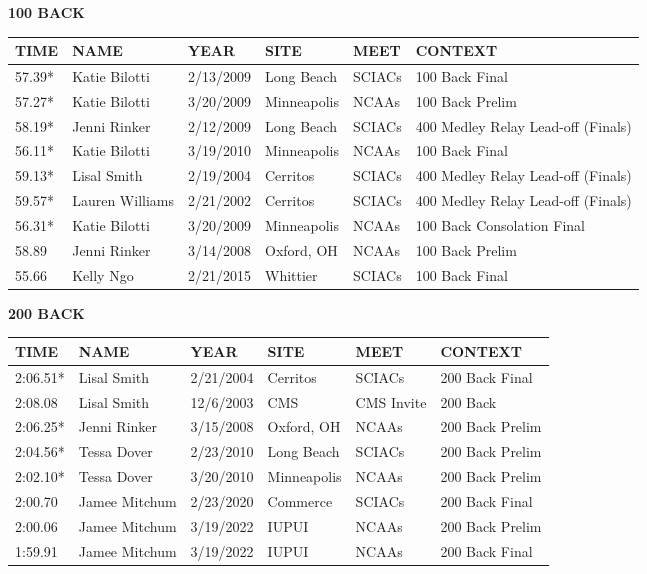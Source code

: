 \begin{minipage}[t]{0.48\textwidth}
\centering
\textbf{100 BACK}\\[0.05cm]
\begin{tabular}{@{}p{1.8cm}p{2.8cm}p{1.2cm}p{1.4cm}p{1.4cm}p{2.0cm}@{}}
\hline
\textbf{TIME} & \textbf{NAME} & \textbf{YEAR} & \textbf{SITE} & \textbf{MEET} & \textbf{CONTEXT} \\
\hline
57.39* & Katie Bilotti & 2/13/2009 & Long Beach & SCIACs & 100 Back Final \\
57.27* & Katie Bilotti & 3/20/2009 & Minneapolis & NCAAs & 100 Back Prelim \\
58.19* & Jenni Rinker & 2/12/2009 & Long Beach & SCIACs & 400 Medley Relay Lead-off (Finals) \\
56.11* & Katie Bilotti & 3/19/2010 & Minneapolis & NCAAs & 100 Back Final \\
59.13* & Lisal Smith & 2/19/2004 & Cerritos & SCIACs & 400 Medley Relay Lead-off (Finals) \\
59.57* & Lauren Williams & 2/21/2002 & Cerritos & SCIACs & 400 Medley Relay Lead-off (Finals) \\
56.31* & Katie Bilotti & 3/20/2009 & Minneapolis & NCAAs & 100 Back Consolation Final \\
58.89 & Jenni Rinker & 3/14/2008 & Oxford, OH & NCAAs & 100 Back Prelim \\
55.66 & Kelly Ngo & 2/21/2015 & Whittier & SCIACs & 100 Back Final \\
\hline
\end{tabular}
\end{minipage}\hfill
\begin{minipage}[t]{0.48\textwidth}
\centering
\textbf{200 BACK}\\[0.05cm]
\begin{tabular}{@{}p{1.8cm}p{2.8cm}p{1.2cm}p{1.4cm}p{1.4cm}p{2.0cm}@{}}
\hline
\textbf{TIME} & \textbf{NAME} & \textbf{YEAR} & \textbf{SITE} & \textbf{MEET} & \textbf{CONTEXT} \\
\hline
2:06.51* & Lisal Smith & 2/21/2004 & Cerritos & SCIACs & 200 Back Final \\
2:08.08 & Lisal Smith & 12/6/2003 & CMS & CMS Invite & 200 Back \\
2:06.25* & Jenni Rinker & 3/15/2008 & Oxford, OH & NCAAs & 200 Back Prelim \\
2:04.56* & Tessa Dover & 2/23/2010 & Long Beach & SCIACs & 200 Back Prelim \\
2:02.10* & Tessa Dover & 3/20/2010 & Minneapolis & NCAAs & 200 Back Prelim \\
2:00.70 & Jamee Mitchum & 2/23/2020 & Commerce & SCIACs & 200 Back Final \\
2:00.06 & Jamee Mitchum & 3/19/2022 & IUPUI & NCAAs & 200 Back Prelim \\
1:59.91 & Jamee Mitchum & 3/19/2022 & IUPUI & NCAAs & 200 Back Final \\
\hline
\end{tabular}
\end{minipage}

